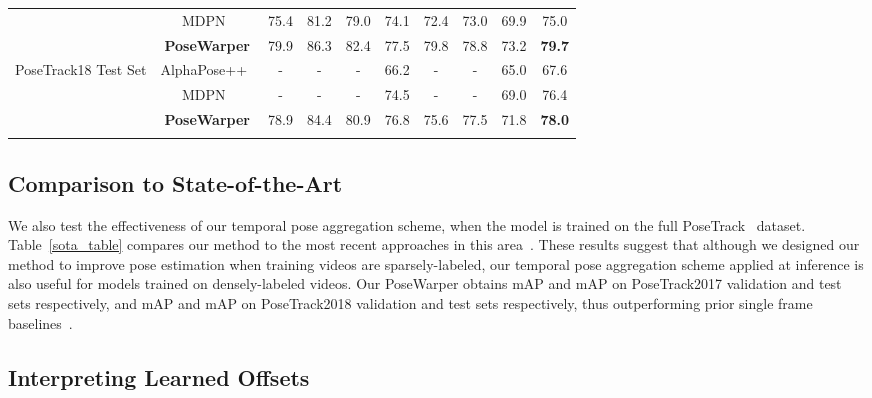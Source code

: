 \documentclass{article}
\begin{document}
\begin{table}[t]
\begin{center}
\begin{tabular}{c c c  c  c  c  c  c  c | c }
  & MDPN~\cite{DBLP:conf/eccv/GuoTLCLW18} & 75.4 & 81.2 & 79.0 & 74.1 & 72.4 & 73.0 & 69.9 & 75.0\\
  & \bf PoseWarper & 79.9 & 86.3 & 82.4 & 77.5 & 79.8 & 78.8 & 73.2 & \bf 79.7\\
  \hline
    \multirow{3}{*}{PoseTrack18 Test Set} & AlphaPose++~\cite{DBLP:conf/eccv/GuoTLCLW18, Fang_2017_ICCV} & - & - & - & 66.2 & - & - & 65.0 & 67.6\\
  & MDPN~\cite{DBLP:conf/eccv/GuoTLCLW18} & - & - & - & 74.5 & - & - & 69.0 & 76.4\\
  & \bf PoseWarper & 78.9 & 84.4 & 80.9 & 76.8 & 75.6 & 77.5 & 71.8 & \bf 78.0\\
 \hline
 \vspace{-0.5cm}
\end{tabular}
\end{center}
\end{table}


\subsection{Comparison to State-of-the-Art}



We also test the effectiveness of our temporal pose aggregation scheme, when the model is trained on the full PoseTrack~\cite{Iqbal_CVPR2017} dataset. Table~\ref{sota_table} compares our method to the most recent approaches in this area~\cite{girdhar2018detecttrack,xiu2018poseflow,xiao2018simple,sun2019deep}. These results suggest that although we designed our method to improve pose estimation when training videos are sparsely-labeled, our temporal pose aggregation scheme applied at inference is also useful for models trained on densely-labeled videos. Our PoseWarper obtains  mAP and  mAP on PoseTrack2017 validation and test sets respectively, and  mAP and  mAP on PoseTrack2018 validation and test sets respectively, thus outperforming prior single frame baselines~\cite{girdhar2018detecttrack,xiu2018poseflow,xiao2018simple,sun2019deep}.













\subsection{Interpreting Learned Offsets}
\end{document}
